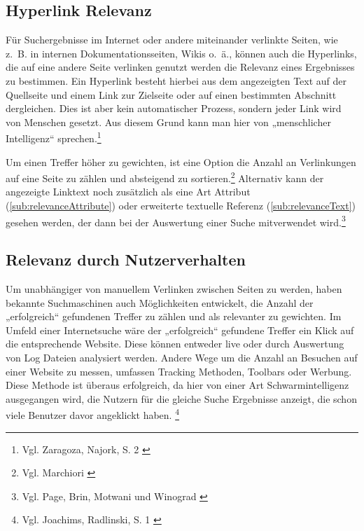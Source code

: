 \subsection{Hyperlink Relevanz}
\label{sub:relevanceHyperlink}
Für Suchergebnisse im Internet oder andere miteinander verlinkte Seiten, wie z. B. in internen Dokumentationsseiten, Wikis o. ä., können auch die Hyperlinks,
die auf eine andere Seite verlinken genutzt werden die Relevanz eines Ergebnisses zu bestimmen.
Ein Hyperlink besteht hierbei aus dem angezeigten Text auf der Quellseite und einem Link zur Zielseite oder auf einen bestimmten Abschnitt dergleichen. Dies ist aber kein automatischer Prozess, sondern jeder Link wird von Menschen gesetzt. Aus diesem Grund kann man hier von „menschlicher Intelligenz“ sprechen.\footnote{Vgl. Zaragoza, Najork, S. 2 \cite{zaragoza2018}}

Um einen Treffer höher zu gewichten, ist eine Option die Anzahl an Verlinkungen auf eine Seite zu zählen und absteigend zu sortieren.\footnote{Vgl. Marchiori \cite{marchiori1997}}
Alternativ kann der angezeigte Linktext noch zusätzlich als eine Art Attribut (\ref{sub:relevanceAttribute}) oder erweiterte textuelle Referenz (\ref{sub:relevanceText}) gesehen werden, der dann bei der Auswertung einer Suche mitverwendet wird.\footnote{Vgl. Page, Brin, Motwani und Winograd \cite{ilprints422}}

\subsection{Relevanz durch Nutzerverhalten}
\label{sub:relevanceUser}
Um unabhängiger von manuellem Verlinken zwischen Seiten zu werden, haben bekannte Suchmaschinen auch Möglichkeiten entwickelt, die Anzahl der „erfolgreich“ gefundenen Treffer zu zählen und als relevanter zu gewichten.
Im Umfeld einer Internetsuche wäre der „erfolgreich“ gefundene Treffer ein Klick auf die entsprechende Website.
Diese können entweder live oder durch Auswertung von Log Dateien analysiert werden. Andere Wege um die Anzahl an Besuchen auf einer Website zu messen, umfassen Tracking Methoden, Toolbars oder Werbung.
Diese Methode ist überaus erfolgreich, da hier von einer Art Schwarmintelligenz ausgegangen wird, die Nutzern für die gleiche Suche Ergebnisse anzeigt, die schon viele Benutzer davor angeklickt haben. \footnote{Vgl. Joachims, Radlinski, S. 1 \cite{joachims2007}}

